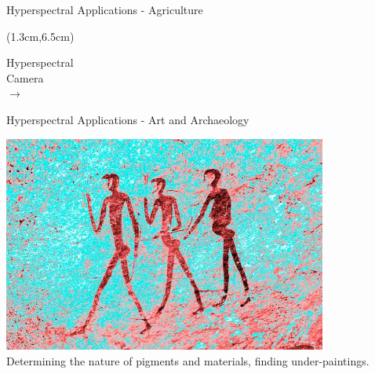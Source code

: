 \documentclass{beamer}
\begin{document}
\begin{frame}{Hyperspectral Applications - Agriculture}
\begin{textblock*}{10cm}
   \end{textblock*}
   \begin{textblock*}{\textwidth}(1.3cm,6.5cm) %
      \begin{center}
         {\huge Hyperspectral \\ Camera} \\ {\Huge $\rightarrow$}
      \end{center}
   \end{textblock*}
\end{frame}

\begin{frame}{Hyperspectral Applications - Art and Archaeology}
   \begin{center}
      \includegraphics[width=0.8\textwidth]{figures/archaeology.jpg}
      \\Determining the nature of pigments and materials, finding under-paintings.
   \end{center}
\end{frame}
\end{document}
